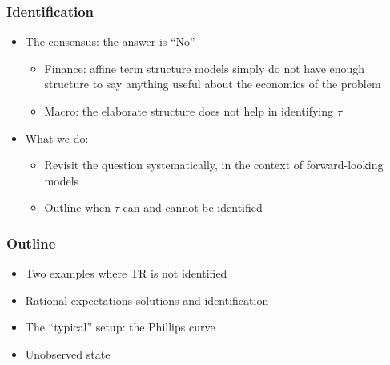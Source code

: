 \documentclass[handout]{beamer}
\begin{document}
\begin{frame}
\frametitle{Identification}

\begin{itemize} \itemsep=\bigskipamount
   \item The consensus: the answer is ``No''
       \begin{itemize}
            \item Finance: affine term structure models simply do not have enough structure to say anything useful about the economics of the problem
            \item Macro: the elaborate structure does not help in identifying $\tau$
       \end{itemize}
   \pause
    \item What we do:
        \begin{itemize}
            \item Revisit the question systematically, in the context of forward-looking models
            \item  Outline when $\tau$ can and cannot be identified
          \end{itemize}
\end{itemize}


\end{frame}

\begin{frame}
\frametitle{Outline}

\begin{itemize} \itemsep=\bigskipamount
  \item Two examples where TR is not identified
  \item Rational expectations solutions and identification
  \item The ``typical'' setup: the Phillips curve
  \item Unobserved state
\end{itemize}



\end{frame}
\end{document}
